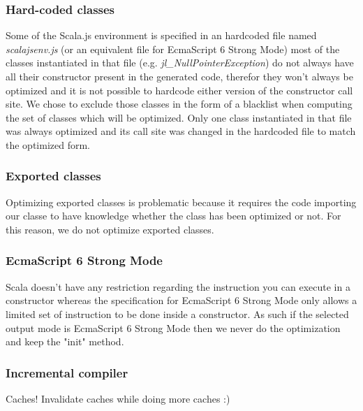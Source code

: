 \subsubsection{Hard-coded classes}
Some of the Scala.js environment is specified in an hardcoded file named \emph{scalajsenv.js} (or an equivalent file for EcmaScript 6 Strong Mode) most of the classes instantiated in that file (e.g. \emph{jl\_NullPointerException}) do not always have all their constructor present in the generated code, therefor they won't always be optimized and it is not possible to hardcode either version of the constructor call site. We chose to exclude those classes in the form of a blacklist when computing the set of classes which will be optimized. Only one class instantiated in that file was always optimized and its call site was changed in the hardcoded file to match the optimized form.
\subsubsection{Exported classes}
Optimizing exported classes is problematic because it requires the code importing our classe to have knowledge whether the class has been optimized or not. For this reason, we do not optimize exported classes.
\subsubsection{EcmaScript 6 Strong Mode}
Scala doesn't have any restriction regarding the instruction you can execute in a constructor whereas the specification for EcmaScript 6 Strong Mode only allows a limited set of instruction to be done inside a constructor. As such if the selected output mode is EcmaScript 6 Strong Mode then we never do the optimization and keep the "init" method.
\subsubsection{Incremental compiler}
Caches! Invalidate caches while doing more caches :)

